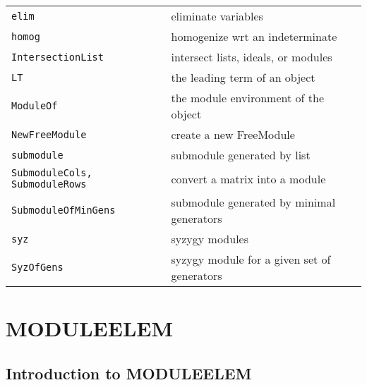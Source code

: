 \documentclass[a4paper]{mybook}
\begin{document}
\begin{center}
\begin{longtable}{ll}
   
{\verb~elim~} &
      eliminate variables\\
   
{\verb~homog~} &
      homogenize wrt an indeterminate\\
   
{\verb~IntersectionList~} &
      intersect lists, ideals, or modules\\
   
{\verb~LT~} &
      the leading term of an object\\
   
{\verb~ModuleOf~} &
      the module environment of the object\\
   
{\verb~NewFreeModule~} &
      create a new FreeModule\\
   
{\verb~submodule~} &
      submodule generated by list\\
   
{\verb~SubmoduleCols, SubmoduleRows~} &
      convert a matrix into a module\\
   
{\verb~SubmoduleOfMinGens~} &
      submodule generated by minimal generators\\
   
{\verb~syz~} &
      syzygy modules\\
   
{\verb~SyzOfGens~} &
      syzygy module for a given set of generators\\
   
\end{longtable}
\end{center}

\noindent



\chapter{MODULEELEM}
\label{MODULEELEM}

      

\section{Introduction to MODULEELEM}
\label{Introduction to MODULEELEM}
\end{document}
